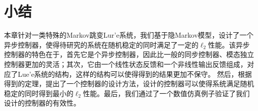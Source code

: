 \section{小结}
	本章针对一类特殊的Markov跳变Lur'e系统，我们基于隐Markov模型，设计了一个异步控制器，使得待研究的系统在随机稳定的同时满足了一定的$\ell_2$性能。该异步控制器的特色在于，首先它是个异步控制器，因此比一般的同步控制器、模态独立控制器更加的灵活；其次，它由一个线性状态反馈和一个非线性输出反馈组成，对应了Lue'e系统的结构，这样的结构可以使得得到的结果更加不保守。 然后，根据得到的定理，提出了一个控制器的设计方法，设计的控制器可以使得系统满足随机稳定的同时得到最小的$\ell_2$性能。最后，我们通过了一个数值仿真例子验证了我们设计的控制器的有效性。